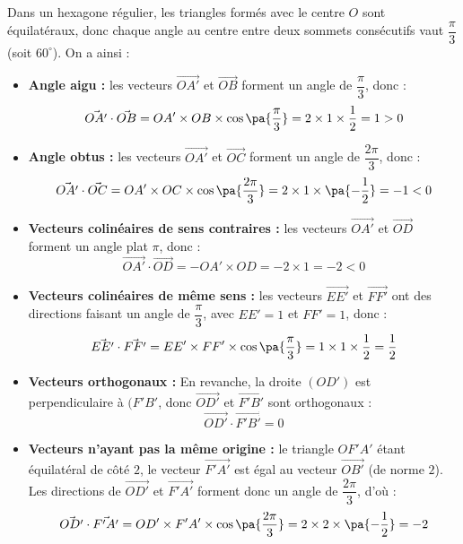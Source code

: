 \begin{exemple}
	Dans un hexagone régulier, les triangles formés avec le centre $O$ sont équilatéraux, donc chaque angle au centre entre deux sommets consécutifs vaut $\dfrac{\pi}{3}$ (soit $60^\circ$). On a ainsi :

	\begin{itemize}
		\item \textbf{Angle aigu :} les vecteurs $\vec{OA'}$ et $\vec{OB}$ forment un angle de $\dfrac{\pi}{3}$, donc :
		      \[
			      \vec{OA'} \cdot \vec{OB} = OA' \times OB \times \cos\pa{\dfrac{\pi}{3}} = 2 \times 1 \times \dfrac{1}{2} = 1 > 0
		      \]

		\item \textbf{Angle obtus :} les vecteurs $\vec{OA'}$ et $\vec{OC}$ forment un angle de $\dfrac{2\pi}{3}$, donc :
		      \[
			      \vec{OA'} \cdot \vec{OC} = OA' \times OC \times \cos\pa{\dfrac{2\pi}{3}} = 2 \times 1 \times \pa{-\dfrac{1}{2}} = -1 < 0
		      \]

		\item \textbf{Vecteurs colinéaires de sens contraires :} les vecteurs $\vec{OA'}$ et $\vec{OD}$ forment un angle plat $\pi$, donc :
		      \[
			      \vec{OA'} \cdot \vec{OD} = -OA' \times OD = -2 \times 1 = -2 < 0
		      \]
		\item \textbf{Vecteurs colinéaires de même sens :} les vecteurs $\vec{EE'}$ et $\vec{FF'}$ ont des directions faisant un angle de $\dfrac{\pi}{3}$, avec $EE' = 1$ et $FF' = 1$, donc :
		      \[
			      \vec{EE'} \cdot \vec{FF'} = EE' \times FF' \times \cos\pa{\dfrac{\pi}{3}} = 1 \times 1 \times \dfrac{1}{2} = \dfrac{1}{2}
		      \]
		\item \textbf{Vecteurs orthogonaux :} En revanche, la droite $(OD')$ est perpendiculaire à $(F'B'$, donc $\vec{OD'}$ et $\vec{F'B'}$ sont orthogonaux :
		      \[
			      \vec{OD'} \cdot \vec{F'B'} = 0
		      \]
		\item \textbf{Vecteurs n'ayant pas la même origine :} le triangle $OF'A'$ étant équilatéral de côté $2$, le vecteur $\vec{F'A'}$ est égal au vecteur $\vec{OB'}$ (de norme $2$). Les directions de $\vec{OD'}$ et $\vec{F'A'}$ forment donc un angle de $\dfrac{2\pi}{3}$, d'où :
		      \[
			      \vec{OD'} \cdot \vec{F'A'} = OD' \times F'A' \times \cos\pa{\dfrac{2\pi}{3}} = 2 \times 2 \times \pa{-\dfrac{1}{2}} = -2
		      \]
	\end{itemize}
\end{exemple}

\newpage

